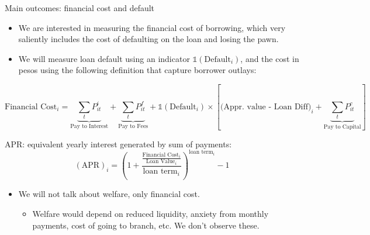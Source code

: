 \documentclass[8pt]{beamer}
\begin{document}
\begin{frame}{Main outcomes: financial cost and default}
\label{fc_outcome}
\begin{itemize}
    \item We are interested in measuring the financial cost of borrowing, which very saliently includes the cost of defaulting on the loan and losing the pawn.
    \item We will measure loan default using an indicator $\mathds{1}(\text{Default}_i)$, and the cost in pesos using the following definition that capture borrower outlays:
\end{itemize}

   \begin{equation*}
    \text{Financial Cost}_i =  \underbrace{\sum_t P^i_{it}}_{\text{Pay to Interest}} + \underbrace{\sum_t P^f_{it}}_{\text{Pay to Fees}}  + \mathds{1}(\text{Default}_i) \times \left[\text{(Appr. value - Loan Diff)}_i + \underbrace{\sum_t P^c_{it}}_{\text{Pay to Capital}} \right]
   \end{equation*}

\vspace{.2in}
\: \: \: \: APR: equivalent yearly interest generated by sum of payments:
   \begin{equation*}
    (\text{APR})_i =\left( 1 + \frac{\frac{\text{Financial Cost}_i}{\text{Loan Value}_i}}{\text{loan term}_i}\right)^{\text{loan term}_i}-1 
\end{equation*}

   \vspace{.2in}
\begin{itemize}
    \item We \alert{will not talk about welfare}, only financial cost.
    \begin{itemize}
        \item Welfare would depend on reduced liquidity, anxiety from monthly payments, cost of going to branch, etc. We don't observe these.
    \end{itemize}
\end{itemize}
\end{frame}
\end{document}
